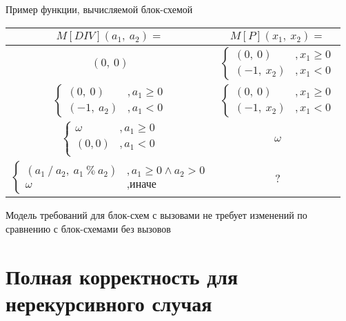 \documentclass[hyperref={unicode=true}]{beamer}
\begin{document}
    \begin{frame}[fragile]{Пример функции, вычисляемой блок-схемой}
    \begin{table}[]
    \begin{tabular}{|c|c|}
    \hline
    $M[DIV](a_1,~a_2) =$ & $M[P](x_1,~x_2) =$ \\
    \hline
    $(0,~0)$
    &
    $\begin{cases}
            (0,~0) &, x_1 \geq 0 \\
            (-1,~x_2) &, x_1 < 0\end{cases}$\\
    \hline
    $\begin{cases}
            (0,~0) &, a_1 \geq 0 \\
            (-1,~a_2) &, a_1 < 0\end{cases}$
    &
    $\begin{cases}
            (0,~0) &, x_1 \geq 0 \\
            (-1,~x_2) &, x_1 < 0\end{cases}$ \\
    \hline
    $\begin{cases}
            \omega &, a_1 \geq 0 \\
            (0, 0) &, a_1 < 0 \\ \end{cases}$
    &
    $\omega$ \\
    \hline
    $\begin{cases}
            (a_1~/~a_2,~a_1~\%~a_2) &, a_1 \geq 0 \land a_2 > 0 \\
            \omega &, \mbox{иначе}\end{cases}$
    &
    ?\\ \hline
    \end{tabular}
    \end{table}
    \end{frame}

    \begin{frame}{Модель требований для блок-схем с вызовами}
    не требует изменений по сравнению с блок-схемами без вызовов
    \end{frame}

    \section{Полная корректность для нерекурсивного случая}
\end{document}
